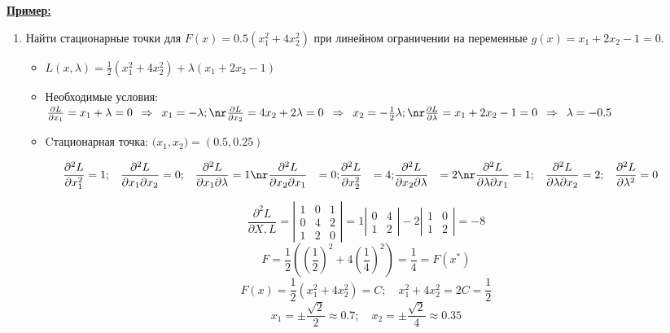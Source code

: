 \documentclass[preprint,russian,a5paper,10pt,twoside,mediummath]{ncc}
\newcommand{\ExampleMy}{\vspace{\baselineskip}\textbf{\underline{Пример:}}}
\begin{document}
\ExampleMy
\begin{enumerate}[resume]
\item Найти стационарные точки для $F\left( x \right)=0.5\left( x_{1}^{2}+4x_{2}^{2} \right)$ при линейном ограничении на переменные $g\left( x \right)={{x}_{1}}+2{{x}_{2}}-1=0$.
\begin{itemize}
\item $L\left( x,\lambda  \right)=\frac{1}{2}\left( x_{1}^{2}+4x_{2}^{2} \right)+\lambda \left( {{x}_{1}}+2{{x}_{2}}-1 \right)$
\item Необходимые условия: $ \frac{\partial L}{\partial x_1} = x_1 + \lambda = 0 \enskip \Rightarrow \enskip x_1 = - \lambda ; \nr \frac{\partial L}{\partial x_2} = 4x_2 + 2\lambda = 0 \enskip \Rightarrow \enskip x_2 = - \frac{1}{2} \lambda ; \nr \frac{\partial L}{\partial \lambda } = x_1 + 2x_2 - 1 = 0 \enskip \Rightarrow \enskip \lambda = -0.5 $
\item Cтационарная точка: $ \bigl( x_1, x_2 \bigr) = \left( 0.5, 0.25 \right) $
\end{itemize}

\begin{align*}
\frac{\partial ^2 L}{\partial x_1^2} &= 1; & \frac{\partial ^2 L}{\partial x_1 \partial x_2} &= 0; & \frac{\partial ^2 L}{\partial x_1 \partial \lambda} &= 1 \nr
\frac{\partial ^2 L}{\partial x_2 \partial x_1} &= 0; & \frac{\partial ^2 L}{\partial x_2^2} &= 4; & \frac{\partial ^2 L}{\partial x_2 \partial \lambda} &= 2 \nr
\frac{\partial ^2 L}{\partial \lambda \partial x_1} &= 1; & \frac{\partial ^2 L}{\partial \lambda \partial x_2} &= 2; & \frac{\partial ^2 L}{\partial \lambda ^2} &= 0
\end{align*}

\[ \frac{{{\partial }^{2}}L}{\partial X, L} = \left| \begin{matrix}
   1 & 0 & 1  \\
   0 & 4 & 2  \\
   1 & 2 & 0 
\end{matrix} \right| = 1 \left| \begin{matrix}
   0 & 4  \\
   1 & 2 
\end{matrix} \right| - 2 \left| \begin{matrix}
   1 & 0  \\
   1 & 2 
\end{matrix} \right| = -8 \]
\[ F = \frac{1}{2} \left( { \left( \frac{1}{2} \right) }^2 + 4 { \left( \frac{1}{4} \right) }^2 \right) = \frac{1}{4} = F \left( x^* \right) \]
\[ F(x) = \frac{1}{2} \left( x_1^2 + 4x_2^2 \right) = C; \quad x_1^2 + 4x_2^2 = 2C = \frac{1}{2} \] 
\[ x_1 = \pm \frac{\sqrt{2}}{2} \approx 0.7; \quad x_2 = \pm \frac{\sqrt{2}}{4} \approx 0.35 \]
\end{enumerate}
\end{document}
